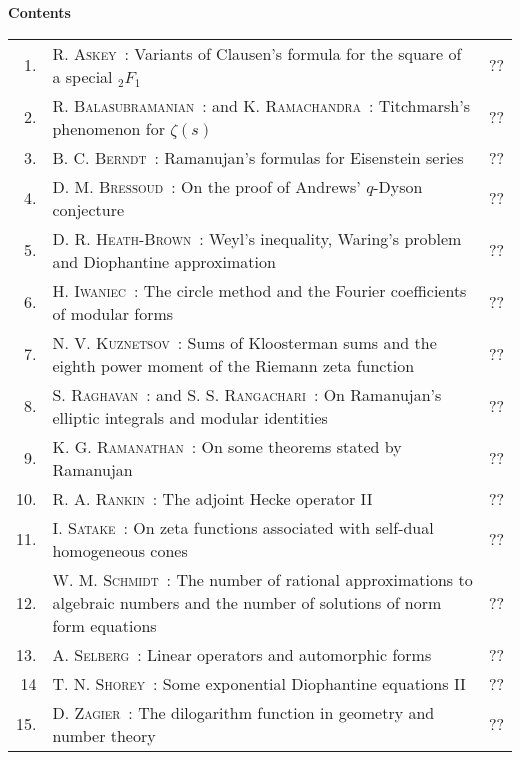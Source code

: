 
\thispagestyle{empty}

\noindent
{\bf\huge Contents}

\vskip 1cm


\noindent
\renewcommand{\arraystretch}{1.7}
\begin{longtable}[l]{r>{\raggedright}p{9cm}r}
1. & \textsc{R. Askey~:}  Variants of Clausen's formula for the square of a special ${}_2F_1$ & ?? \\
2. & \textsc{R. Balasubramanian~:} and \textsc{K. Ramachandra~:}  Titchmarsh's phenomenon for $\zeta(s)$ & ?? \\
3. & \textsc{B. C. Berndt~:}  Ramanujan's formulas for Eisenstein series & ?? \\
4. & \textsc{D. M. Bressoud~:}  On the proof of Andrews' $q$-Dyson conjecture & ?? \\
5. & \textsc{D. R. Heath-Brown~:}  Weyl's inequality, Waring's problem and Diophantine approximation & ?? \\
6. & \textsc{H. Iwaniec~:}  The circle method and the Fourier coefficients of modular forms & ?? \\
7. & \textsc{N. V. Kuznetsov~:}  Sums of Kloosterman sums and the eighth power moment of the Riemann zeta function & ?? \\
8. & \textsc{S. Raghavan~:}  and \textsc{S. S. Rangachari~:}  On Ramanujan's elliptic integrals and modular identities & ?? \\
9. & \textsc{K. G. Ramanathan~:}  On some theorems stated by Ramanujan & ?? \\
10. & \textsc{R. A. Rankin~:}  The adjoint Hecke operator II & ?? \\  
11. & \textsc{I. Satake~:}  On zeta functions associated with self-dual homogeneous cones & ?? \\
12. & \textsc{W. M. Schmidt~:} The number of rational approximations to algebraic numbers and the number of solutions of norm form equations & ?? \\
13. & \textsc{A. Selberg~:}  Linear operators and automorphic forms & ?? \\
14 & \textsc{T. N. Shorey~:}  Some exponential Diophantine equations II & ?? \\
15. & \textsc{D. Zagier~:}  The dilogarithm function in geometry and number theory & ?? \\
\end{longtable}

\thispagestyle{empty}

